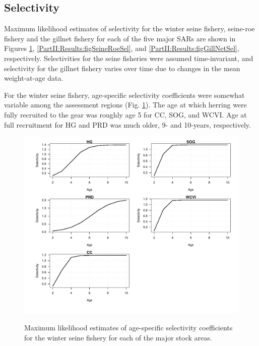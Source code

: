 \subsection{Selectivity}

Maximum likelihood estimates of selectivity for the winter seine fishery, seine-roe fishery and the gillnet fishery for each of the five major SARs are shown in Figures \ref{PartII:Results:figWinterSeineSel}, \ref{PartII:Results:figSeineRoeSel}, and \ref{PartII:Results:figGillNetSel}, respectively.  Selectivities for the seine fisheries were assumed time-invariant, and selectivity for the gillnet fishery varies over time due to changes in the mean weight-at-age data.

For the winter seine fishery, age-specific selectivity coefficients were somewhat variable among the assessment regions (Fig. \ref{PartII:Results:figWinterSeineSel}).  The age at which herring were fully recruited to the gear was roughly age 5 for CC, SOG, and WCVI.  Age at full recruitment for HG and PRD was much older, 9- and 10-years, respectively.


\begin{figure}[!tbp]
	\includegraphics[width=\textwidth]{../FIGS/qPriorFigs/iscam_fig_sel2d_winter_seine_sel.pdf}\\
	\caption{Maximum likelihood estimates of age-specific selectivity coefficients for the winter seine fishery for each of the major stock areas.}\label{PartII:Results:figWinterSeineSel}
\end{figure}

